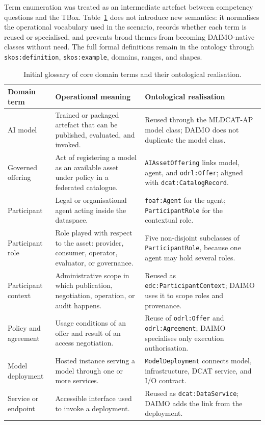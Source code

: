\documentclass[Afour,sagev,times]{sagej}
\newcommand{\code}[1]{\texttt{#1}}
\begin{document}
Term enumeration was treated as an intermediate artefact between competency questions and the TBox. Table~\ref{tab:domain-terms} does not introduce new semantics: it normalises the operational vocabulary used in the scenario, records whether each term is reused or specialised, and prevents broad themes from becoming DAIMO-native classes without need. The full formal definitions remain in the ontology through \code{skos:definition}, \code{skos:example}, domains, ranges, and shapes.

\begin{table}[tb]
\scriptsize\sf\centering
\caption{Initial glossary of core domain terms and their ontological realisation.\label{tab:domain-terms}}
\begin{tabular}{@{}p{2.8cm}p{4.9cm}p{6.8cm}@{}}
\toprule
\textbf{Domain term} & \textbf{Operational meaning} & \textbf{Ontological realisation} \\
\midrule
AI model & Trained or packaged artefact that can be published, evaluated, and invoked. & Reused through the MLDCAT-AP model class; DAIMO does not duplicate the model class. \\
Governed offering & Act of registering a model as an available asset under policy in a federated catalogue. & \code{AIAssetOffering} links model, agent, and \code{odrl:Offer}; aligned with \code{dcat:CatalogRecord}. \\
Participant & Legal or organisational agent acting inside the dataspace. & \code{foaf:Agent} for the agent; \code{ParticipantRole} for the contextual role. \\
Participant role & Role played with respect to the asset: provider, consumer, operator, evaluator, or governance. & Five non-disjoint subclasses of \code{ParticipantRole}, because one agent may hold several roles. \\
Participant context & Administrative scope in which publication, negotiation, operation, or audit happens. & Reused as \code{edc:ParticipantContext}; DAIMO uses it to scope roles and provenance. \\
Policy and agreement & Usage conditions of an offer and result of an access negotiation. & Reuse of \code{odrl:Offer} and \code{odrl:Agreement}; DAIMO specialises only execution authorisation. \\
Model deployment & Hosted instance serving a model through one or more services. & \code{ModelDeployment} connects model, infrastructure, DCAT service, and I/O contract. \\
Service or endpoint & Accessible interface used to invoke a deployment. & Reused as \code{dcat:DataService}; DAIMO adds the link from the deployment. \\

\end{tabular}
\end{table}
\end{document}
